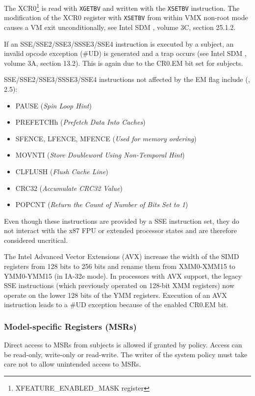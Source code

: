 The XCR0\footnote{XFEATURE\_ENABLED\_MASK register} is read with
\texttt{XGETBV} and written with the \texttt{XSETBV} instruction. The
modification of the XCR0 register with \texttt{XSETBV} from within VMX non-root
mode causes a VM exit unconditionally, see Intel SDM \cite{IntelSDM}, volume
3C, section 25.1.2.

If an SSE/SSE2/SSE3/SSSE3/SSE4 instruction is executed by a subject, an invalid
opcode exception (\#UD) is generated and a trap occurs (see Intel SDM
\cite{IntelSDM}, volume 3A, section 13.2). This is again due to the CR0.EM bit
set for subjects.

SSE/SSE2/SSE3/SSSE3/SSE4 instructions not affected by the EM flag include
(\cite{IntelSDM}, 2.5):
\begin{itemize}
	\item PAUSE (\emph{Spin Loop Hint})
	\item PREFETCHh (\emph{Prefetch Data Into Caches})
	\item SFENCE, LFENCE, MFENCE (\emph{Used for memory ordering})
	\item MOVNTI (\emph{Store Doubleword Using Non-Temporal Hint})
	\item CLFLUSH (\emph{Flush Cache Line})
	\item CRC32 (\emph{Accumulate CRC32 Value})
	\item POPCNT (\emph{Return the Count of Number of Bits Set to 1})
\end{itemize}

Even though these instructions are provided by a SSE instruction set, they do
not interact with the x87 FPU or extended processor states and are therefore
considered uncritical.

The Intel Advanced Vector Extensions (AVX) increase the width of the
SIMD registers from 128 bits to 256 bits and rename them from XMM0-XMM15 to
YMM0-YMM15 (in IA-32e mode). In processors with AVX support, the legacy SSE
instructions (which previously operated on 128-bit XMM registers) now operate on
the lower 128 bits of the YMM registers. Execution of an AVX instruction leads
to a \#UD exception because of the enabled CR0.EM bit.

\subsubsection{Model-specific Registers (MSRs)}
Direct access to MSRs from subjects is allowed if granted by policy. Access can
be read-only, write-only or read-write. The writer of the system policy must
take care not to allow unintended access to MSRs.

